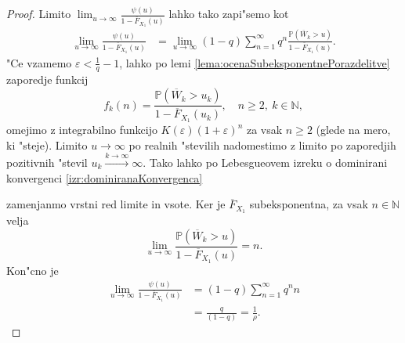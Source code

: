 \documentclass[12pt, a4paper, reqno]{amsart}
\theoremstyle{definition}
\theoremstyle{plain}
\newcommand{\N}{\mathbb{N}}
\newcommand{\Prob}{\mathbb{P}}
\newcommand{\1}{\mathds{1}}
\newcommand*{\refPriloga}[1]{%
  \begingroup
    \hypersetup{
      linkcolor=red,
      linkbordercolor=red,
    }%
    \ref{#1}%
  \endgroup
}
\begin{document}
\begin{proof}
            \noindent
            Limito $\lim_{u\to\infty}\frac{\psi(u)}{1 - \overline{F}_{X_1}(u)}$ lahko tako zapi"semo kot
            \begin{align*}
                \lim_{u\to\infty}\frac{\psi(u)}{1 - \overline{F}_{X_1}(u)}   &= \lim_{u\to\infty}(1 - q)\sum_{n=1}^{\infty}q^n\frac{\Prob\left(\overline{W}_k > u\right)}{1 - \overline{F}_{X_1}(u)}.
            \end{align*}
            "Ce vzamemo $\varepsilon < \frac{1}{q} - 1$, lahko po lemi \ref{lema:ocenaSubeksponentnePorazdelitve} zaporedje funkcij 
            \begin{equation*}
                f_k(n) = \frac{\Prob\left(\overline{W}_k > u_k\right)}{1 - \overline{F}_{X_1}(u_k)}, \quad n\geq 2,\ k\in\N, 
            \end{equation*}
            omejimo z integrabilno funkcijo $K(\varepsilon)(1 + \varepsilon)^n$ za vsak $n\geq 2$ (glede na mero, ki "steje). Limito $u\to\infty$ po 
            realnih "stevilih nadomestimo z limito po zaporedjih pozitivnih "stevil $u_k\xrightarrow{k\to\infty}\infty$.
            Tako lahko po Lebesgueovem izreku o dominirani konvergenci \refPriloga{izr:dominiranaKonvergenca}
            zamenjanmo vrstni red limite in vsote.
            Ker je $\overline{F}_{X_1}$ subeksponentna, za vsak $n\in\N$ velja
            \begin{equation*}
                \lim_{u\to\infty}\frac{\Prob\left(\overline{W}_k > u\right)}{1 - \overline{F}_{X_1}(u)} = n.
            \end{equation*}
            Kon"cno je
            \begin{align*}
                \lim_{u\to\infty}\frac{\psi(u)}{1 - \overline{F}_{X_1}(u)} &= (1 - q)\sum_{n=1}^\infty q^nn \\
                                 &= \frac{q}{(1 - q)} =  \frac{1}{\rho}.
            \end{align*}
        \end{proof}
\end{document}
